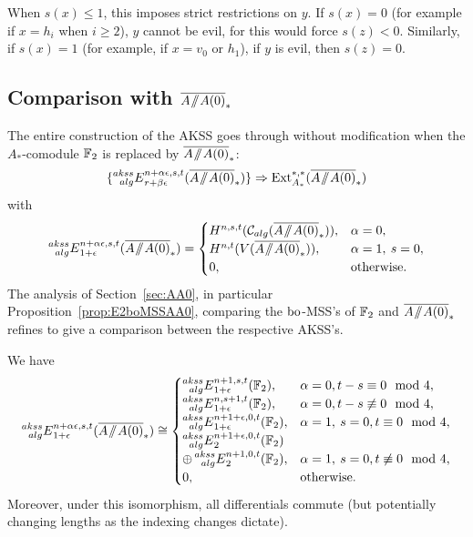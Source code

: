 \begin{rmk}
When $s(x) \leq 1$, this imposes strict restrictions on $y$. If $s(x)=0$ (for example if $x=h_i$ when $i\geq 2$), $y$ cannot be evil, for this would force $s(z) < 0$. 
Similarly, if $s(x)=1$ (for example, if $x = v_0$ or $h_1$), if $y$ is evil, then $s(z) = 0$. 
\end{rmk}






\subsection*{Comparison with $\AA0$}

The entire construction of the AKSS goes through without modification when the $A_*$-comodule $\mathbb{F}_2$ is replaced by $\AA0$:
\[ \{ \E{akss}{alg}_{r+\beta\epsilon}^{n+\alpha \epsilon,s,t}(\AA0) \} \Rightarrow \Ext_{A_*}^{*,*}(\AA0) \]
with 
\[\E{akss}{alg}^{n+\alpha \epsilon, s, t}_{1+\epsilon}(\AA0) = 
\begin{cases}
H^{n, s, t}(\mc{C}_{alg}(\AA0)), & \alpha = 0, \\
H^{n, t}(V(\AA0)), & \alpha = 1, \: s = 0, \\
0, & \text{otherwise}.
\end{cases}
\]
The analysis of Section~\ref{sec:AA0}, in particular Proposition~\ref{prop:E2boMSSAA0}, comparing the $\mathrm{bo}$-MSS's of $\mathbb{F}_2$ and $\AA0$ refines to give a comparison between the respective AKSS's.

\begin{thm}
We have
\[\E{akss}{alg}^{n+\alpha \epsilon, s, t}_{1+\epsilon}(\AA0) \cong 
\begin{cases}
\E{akss}{alg}^{n+1, s, t}_{1+\epsilon}(\FF_2), & \alpha = 0, t-s \equiv 0 \mod 4, \\
\E{akss}{alg}^{n, s+1, t}_{1+\epsilon}(\FF_2), & \alpha = 0, t-s \not\equiv 0 \mod 4, \\
\E{akss}{alg}^{n+1+\epsilon,0,t}_{1+\epsilon}(\FF_2), & \alpha = 1, \: s = 0, t \equiv 0 \mod 4, \\
\E{akss}{alg}^{n+1+\epsilon,0,t}_2(\FF_2)  \\
\oplus \E{akss}{alg}^{n+1,0,t}_2(\FF_2), & \alpha = 1, \: s = 0, t \not\equiv 0 \mod 4, \\
0, & \text{otherwise}.
\end{cases}
\]
Moreover, under this isomorphism, all differentials commute (but potentially changing lengths as the indexing changes dictate).
\end{thm}

